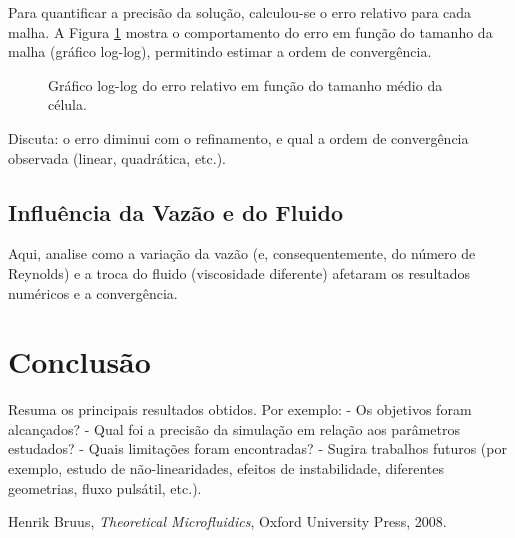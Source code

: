 \documentclass[12pt, a4paper]{article}
\begin{document}
Para quantificar a precisão da solução, calculou-se o erro relativo para cada malha.  
A Figura \ref{fig:convergencia} mostra o comportamento do erro em função do tamanho da malha (gráfico log-log), permitindo estimar a ordem de convergência.

\begin{figure}[H]
    \centering
    \caption{Gráfico log-log do erro relativo em função do tamanho médio da célula.}
    \label{fig:convergencia}
\end{figure}

Discuta: o erro diminui com o refinamento, e qual a ordem de convergência observada (linear, quadrática, etc.).

\subsection{Influência da Vazão e do Fluido}

Aqui, analise como a variação da vazão (e, consequentemente, do número de Reynolds) e a troca do fluido (viscosidade diferente) afetaram os resultados numéricos e a convergência.

\section{Conclusão}

Resuma os principais resultados obtidos.  
Por exemplo:
- Os objetivos foram alcançados?
- Qual foi a precisão da simulação em relação aos parâmetros estudados?
- Quais limitações foram encontradas?
- Sugira trabalhos futuros (por exemplo, estudo de não-linearidades, efeitos de instabilidade, diferentes geometrias, fluxo pulsátil, etc.).

\newpage
\begin{thebibliography}{9}
    Henrik Bruus, \textit{Theoretical Microfluidics}, Oxford University Press, 2008.
\end{thebibliography}
\end{document}
